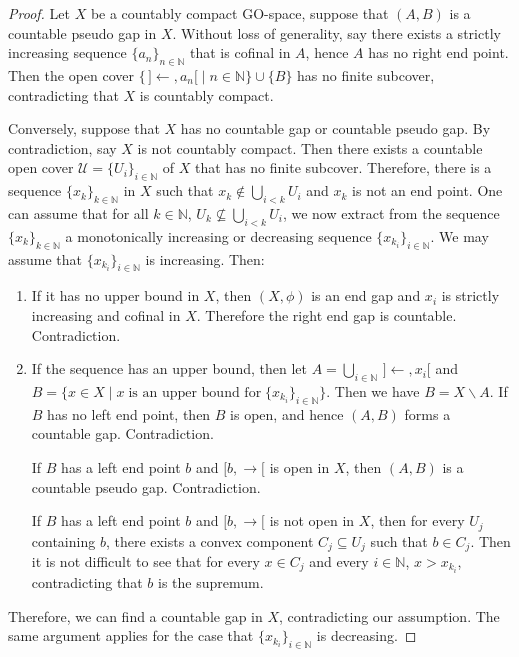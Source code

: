 \documentclass[12pt,oneside,english]{amsbook}
\numberwithin{equation}{section} %
\numberwithin{figure}{section} %
\theoremstyle{plain}
\numberwithin{section}{chapter}
\theoremstyle{plain}
\begin{document}
\begin{proof}
  Let $X$ be a countably compact GO-space, suppose that $(A,B)$ is a countable pseudo gap in $X$. Without loss of generality, say there exists a strictly increasing sequence $\{a_{n}\}_{n \in \mathbb{N}}$ that is cofinal in $A$, hence $A$ has no right end point. Then the open cover $\{\,]\leftarrow, a_{n}[ \; | \; n \in \mathbb{N}\} \cup \{B\}$ has no finite subcover, contradicting that $X$ is countably compact.

  Conversely, suppose that $X$ has no countable gap or countable pseudo gap. By contradiction, say $X$ is not countably compact. Then there exists a countable open cover $\mathcal{U} = \{U_{i}\}_{i \in \mathbb{N}}$ of $X$ that has no finite subcover. Therefore, there is a sequence $\{x_k\}_{k \in \mathbb{N}}$ in $X$ such that $x_{k} \notin \bigcup_{i < k}U_{i}$ and $x_k$ is not an end point. One can assume that for all $k \in \mathbb{N}$, $U_k \nsubseteq \bigcup_{i < k }U_i$, we now extract from the sequence $\{x_k\}_{k \in \mathbb{N}}$ a monotonically increasing or decreasing sequence $\{x_{k_i}\}_{i \in \mathbb{N}}$. We may assume that $\{x_{k_i}\}_{i \in \mathbb{N}}$ is increasing. Then:
  \begin{enumerate}
  \item If it has no upper bound in $X$, then $(X, \phi)$ is an end gap and $x_{i}$ is strictly increasing and cofinal in $X$. Therefore the right end gap is countable. Contradiction. 
  \item If the sequence has an upper bound, then let $A = \bigcup_{i \in \mathbb{N}}\, ]\leftarrow, x_{i}[$ and $B = \{ x \in X \; | \; x \; \text{is an upper bound for} \; \{x_{k_i}\}_{i \in \mathbb{N}} \}$. Then we have $B = X \backslash A$. If $B$ has no left end point, then $B$ is open, and hence $(A,B)$ forms a countable gap. Contradiction.

    If $B$ has a left end point $b$ and $[b, \rightarrow [$ is open in $X$, then $(A,B)$ is a countable pseudo gap. Contradiction.

    If $B$ has a left end point $b$ and $[b, \rightarrow [$ is not open in $X$, then for every $U_{j}$ containing $b$, there exists a convex component $C_{j} \subseteq U_{j}$ such that $b \in C_{j}$. Then it is not difficult to see that for every $x \in C_{j}$ and every $i \in \mathbb{N}$,  $x > x_{k_i}$, contradicting that $b$ is the supremum.
  \end{enumerate}

  Therefore, we can find a countable gap in $X$, contradicting our assumption. The same argument applies for the case that $\{x_{k_i}\}_{i \in \mathbb{N}}$ is decreasing.
\end{proof}
\end{document}
